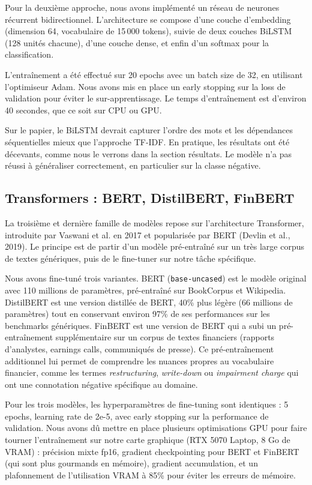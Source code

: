 \documentclass[12pt, a4paper]{article}
\begin{document}
Pour la deuxième approche, nous avons implémenté un réseau de neurones récurrent
bidirectionnel. L'architecture se compose d'une couche d'embedding (dimension 64,
vocabulaire de 15\,000 tokens), suivie de deux couches BiLSTM (128 unités chacune),
d'une couche dense, et enfin d'un softmax pour la classification.

L'entraînement a été effectué sur 20 epochs avec un batch size de 32, en utilisant
l'optimiseur Adam. Nous avons mis en place un early stopping sur la loss de
validation pour éviter le sur-apprentissage. Le temps d'entraînement est d'environ
40 secondes, que ce soit sur CPU ou GPU.

Sur le papier, le BiLSTM devrait capturer l'ordre des mots et les dépendances
séquentielles mieux que l'approche TF-IDF. En pratique, les résultats ont été
décevants, comme nous le verrons dans la section résultats. Le modèle n'a pas
réussi à généraliser correctement, en particulier sur la classe négative.

\subsection{Transformers : BERT, DistilBERT, FinBERT}

La troisième et dernière famille de modèles repose sur l'architecture Transformer,
introduite par Vaswani et al. en 2017 et popularisée par BERT (Devlin et al., 2019).
Le principe est de partir d'un modèle pré-entraîné sur un très large corpus de
textes génériques, puis de le fine-tuner sur notre tâche spécifique.

Nous avons fine-tuné trois variantes. BERT (\texttt{base-uncased}) est le modèle original
avec 110 millions de paramètres, pré-entraîné sur BookCorpus et Wikipedia. DistilBERT
est une version distillée de BERT, 40\% plus légère (66 millions de paramètres) tout
en conservant environ 97\% de ses performances sur les benchmarks génériques. FinBERT
est une version de BERT qui a subi un pré-entraînement supplémentaire sur un corpus
de textes financiers (rapports d'analystes, earnings calls, communiqués de presse).
Ce pré-entraînement additionnel lui permet de comprendre les nuances propres au
vocabulaire financier, comme les termes \textit{restructuring}, \textit{write-down} ou
\textit{impairment charge} qui ont une connotation négative spécifique au domaine.

Pour les trois modèles, les hyperparamètres de fine-tuning sont identiques : 5 epochs,
learning rate de 2e-5, avec early stopping sur la performance de validation. Nous
avons dû mettre en place plusieurs optimisations GPU pour faire tourner l'entraînement
sur notre carte graphique (RTX 5070 Laptop, 8 Go de VRAM) : précision mixte fp16,
gradient checkpointing pour BERT et FinBERT (qui sont plus gourmands en mémoire),
gradient accumulation, et un plafonnement de l'utilisation VRAM à 85\% pour éviter
les erreurs de mémoire.
\end{document}

